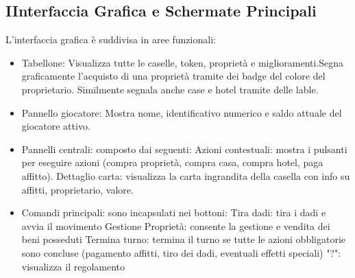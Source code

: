 \subsection{IInterfaccia Grafica e Schermate Principali}
L’interfaccia grafica è suddivisa in aree funzionali:\newline
\begin{itemize}
    \item Tabellone:\newline
    Visualizza tutte le caselle, token, proprietà e miglioramenti.\newline Segna graficamente l'acquisto di una proprietà tramite dei badge del colore del proprietario. Similmente segnala anche case e hotel tramite delle lable.
    \item Pannello giocatore:\newline
    Mostra nome, identificativo numerico e saldo attuale del giocatore attivo.
    \item Pannelli centrali:\newline
    composto dai seguenti:\newline
    Azioni contestuali: mostra i pulsanti per eseguire azioni (compra proprietà, compra casa, compra hotel, paga affitto).\newline
    Dettaglio carta: visualizza la carta ingrandita della casella con info su affitti, proprietario, valore.
    \item Comandi principali:\newline
    sono incapsulati nei bottoni:\newline
    Tira dadi: tira i dadi e avvia il movimento\newline
    Gestione Proprietà: consente la gestione e vendita dei beni posseduti\newline
    Termina turno: termina il turno se tutte le azioni obbligatorie sono concluse (pagamento affitti, tiro dei dadi, eventuali effetti speciali)\newline
    "?": visualizza il regolamento
\end{itemize}
